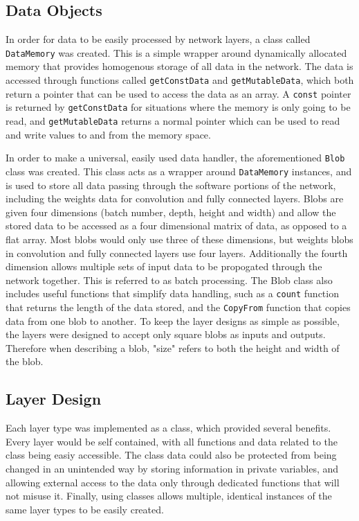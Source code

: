 \documentclass[12pt]{article}
\begin{document}
\subsection{Data Objects}
\label{sec:Design-Network-Blobs}

In order for data to be easily processed by network layers, a class called \lstinline|DataMemory| was created. This is a simple wrapper around dynamically allocated memory that provides homogenous storage of all data in the network. The data is accessed through functions called \lstinline|getConstData| and \lstinline|getMutableData|, which both return a pointer that can be used to access the data as an array. A \lstinline|const| pointer is returned by \lstinline|getConstData| for situations where the memory is only going to be read, and \lstinline|getMutableData| returns a normal pointer which can be used to read and write values to and from the memory space.

In order to make a universal, easily used data handler, the aforementioned \lstinline|Blob| class was created. This class acts as a wrapper around \lstinline|DataMemory| instances, and is used to store all data passing through the software portions of the network, including the weights data for convolution and fully connected layers. Blobs are given four dimensions (batch number, depth, height and width) and allow the stored data to be accessed as a four dimensional matrix of data, as opposed to a flat array. Most blobs would only use three of these dimensions, but weights blobs in convolution and fully connected layers use four layers. Additionally the fourth dimension allows multiple sets of input data to be propogated through the network together. This is referred to as batch processing. The Blob class also includes useful functions that simplify data handling, such as a \lstinline|count| function that returns the length of the data stored, and the \lstinline|CopyFrom| function that copies data from one blob to another. To keep the layer designs as simple as possible, the layers were designed to accept only square blobs as inputs and outputs. Therefore when describing a blob, "size" refers to both the height and width of the blob.

\subsection{Layer Design}
\label{sec:Design-Network-Layers}

Each layer type was implemented as a class, which provided several benefits. Every layer would be self contained, with all functions and data related to the class being easiy accessible. The class data could also be protected from being changed in an unintended way by storing information in private variables, and allowing external access to the data only through dedicated functions that will not misuse it. Finally, using classes allows multiple, identical instances of the same layer types to be easily created.
\end{document}
